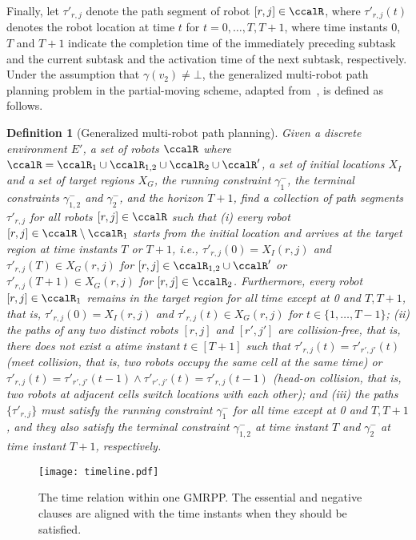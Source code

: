 \documentclass[Afour,sageh,times]{sagej}
\newtheorem{defn}[thm]{Definition}
\begin{document}
{Finally, let $\tau'_{r,j}$ denote the path segment of robot $[r,j] \in \ccalR$, where $\tau'_{r,j}(t)$ denotes the robot location at time $t$ for $ t = 0,  \ldots, T, T+1$, where time instants 0, $T$ and $T+1$ indicate the completion time of the immediately preceding subtask and the current subtask and the activation time of the next subtask, respectively. Under the assumption that $\gamma(v_2) \neq \bot$, the generalized multi-robot path planning problem in the partial-moving scheme, adapted from~\cite{yu2016optimal}, is defined as follows.
 \begin{defn}[Generalized multi-robot path planning]\label{defn:gmmpp}
    Given a discrete environment $E'$, a set of robots $\ccalR$ where $\ccalR = \ccalR_1 \cup\ccalR_{1,2} \cup \ccalR_{2} \cup \ccalR'$, a set of initial locations $X_I$ and a set of target regions $X_G$, the running constraint $\gamma_1^-$, the terminal constraints $\gamma_{1,2}^-$ and $\gamma_2^-$, and the horizon $T+1$, find a collection of path segments $\tau'_{r,j}$ for all robots $[r,j]\in \ccalR$ such that {\it (i)} every robot $[r,j] \in \ccalR\setminus\ccalR_1$ starts from the initial location and arrives at the target region at time instants $T$ or $T+1$, i.e., $ \tau'_{r,j}(0) = X_I(r,j)$ and  $ \tau'_{r,j}(T) \in X_G(r,j)$ for $[r,j] \in  \ccalR_{1,2} \cup \ccalR'$ or $ \tau'_{r,j}(T+1) \in X_G(r,j)$ for $[r,j] \in \ccalR_{2}$. Furthermore, every robot $[r,j] \in \ccalR_1$ remains in the target region for all time except  at 0 and $T, T+1$, that is, $ \tau'_{r,j}(0) = X_I(r,j)$ and $\tau'_{r,j}(t) \in X_G(r,j)$ for $t\in\{1,\ldots, T-1\}$;
  {\it (ii)} the paths of  any two distinct robots $[r,j]$ and $[r', j']$ are collision-free, that is, there does not exist  a atime instant $t \in [T+1]$ such that $\tau'_{r,j}(t) = \tau'_{r',j'}(t)$ (meet collision, that is, two robots occupy the same cell at the same time) or  $\tau'_{r,j}(t) = \tau'_{r',j'}(t-1) \wedge \tau'_{r',j'}(t) = \tau'_{r,j}(t-1)$ (head-on collision, that is, two robots at adjacent cells switch locations with each other); and {\it (iii)} the paths $\{\tau'_{r,j}\}$ must satisfy the running constraint $\gamma^-_1$ for all time except  at 0 and $T, T+1$, and they also satisfy the terminal constraint $\gamma^-_{1,2}$ at time instant $T$ and $\gamma^-_{2}$ at time instant $T+1$, respectively.
 \end{defn}

 \begin{figure}[!t]
   \centering
   \texttt{[image: timeline.pdf]}
   \caption{The time relation within one GMRPP. The essential and negative clauses are aligned with the time instants when they should be satisfied.}
   \label{fig:timeline}
 \end{figure}

}
\end{document}
